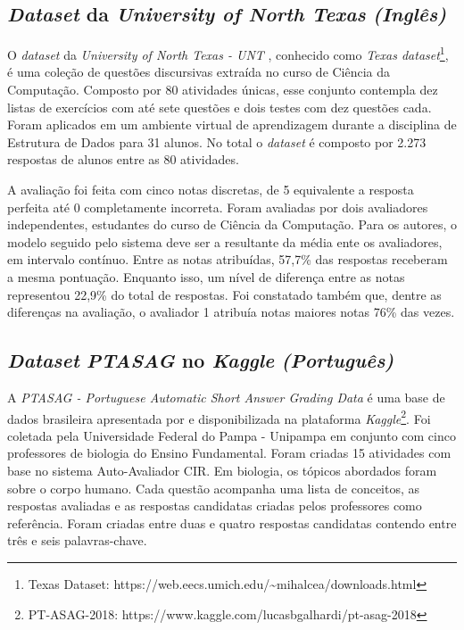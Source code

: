\subsection{\textit{Dataset} da \textit{University of North Texas} \textit{(Inglês)}}
\label{ntexasunv-db}

O \textit{dataset} da \textit{University of North Texas - UNT} \cite{mohler2011}, conhecido como \textit{Texas dataset}\footnote{Texas Dataset: https://web.eecs.umich.edu/{\textasciitilde}mihalcea/downloads.html}, é uma coleção de questões discursivas extraída no curso de Ciência da Computação. Composto por 80 atividades únicas, esse conjunto contempla dez listas de exercícios com até sete questões e dois testes com dez questões cada. Foram aplicados em um ambiente virtual de aprendizagem durante a disciplina de Estrutura de Dados para 31 alunos. No total o \textit{dataset} é composto por 2.273 respostas de alunos entre as 80 atividades.

A avaliação foi feita com cinco notas discretas, de 5 equivalente a resposta perfeita até 0 completamente incorreta. Foram avaliadas por dois avaliadores independentes, estudantes do curso de Ciência da Computação. Para os autores, o modelo seguido pelo sistema deve ser a resultante da média ente os avaliadores, em intervalo contínuo. Entre as notas atribuídas, 57,7\% das respostas receberam a mesma pontuação. Enquanto isso, um nível de diferença entre as notas representou 22,9\% do total de respostas. Foi constatado também que, dentre as diferenças na avaliação, o avaliador 1 atribuía notas maiores notas 76\% das vezes.

\subsection{\textit{Dataset} \textit{PTASAG} no \textit{Kaggle} \textit{(Português)}}
\label{ptasag-db}

A \textit{PTASAG - Portuguese Automatic Short Answer Grading Data} é uma base de dados brasileira apresentada por \cite{galhardi2018b} e disponibilizada na plataforma \textit{Kaggle}\footnote{PT-ASAG-2018: https://www.kaggle.com/lucasbgalhardi/pt-asag-2018}. Foi coletada pela Universidade Federal do Pampa - Unipampa em conjunto com cinco professores de biologia do Ensino Fundamental. Foram criadas 15 atividades com base no sistema Auto-Avaliador CIR. Em biologia, os tópicos abordados foram sobre o corpo humano. Cada questão acompanha uma lista de conceitos, as respostas avaliadas e as respostas candidatas criadas pelos professores como referência. Foram criadas entre duas e quatro respostas candidatas contendo entre três e seis palavras-chave.

